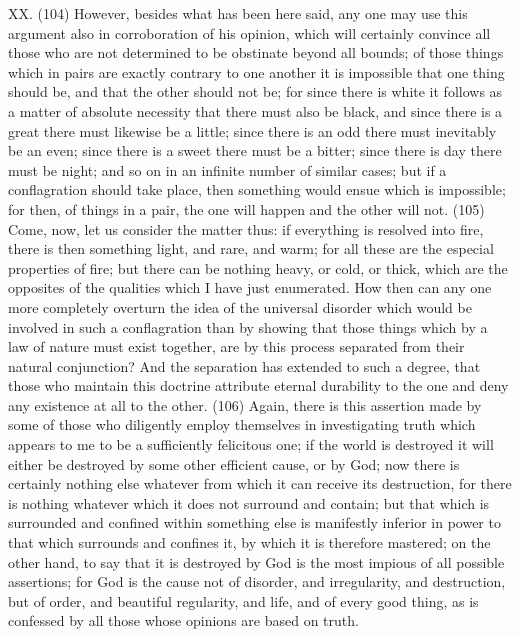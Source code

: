 XX. (104) However, besides what has been here said, any one may use this argument also in
corroboration of his opinion, which will certainly convince all those who are not determined to be
obstinate beyond all bounds; of those things which in pairs are exactly contrary to one another it is
impossible that one thing should be, and that the other should not be; for since there is white it
follows as a matter of absolute necessity that there must also be black, and since there is a great
there must likewise be a little; since there is an odd there must inevitably be an even; since there is
a sweet there must be a bitter; since there is day there must be night; and so on in an infinite
number of similar cases; but if a conflagration should take place, then something would ensue
which is impossible; for then, of things in a pair, the one will happen and the other will not. (105)
Come, now, let us consider the matter thus: if everything is resolved into fire, there is then
something light, and rare, and warm; for all these are the especial properties of fire; but there can
be nothing heavy, or cold, or thick, which are the opposites of the qualities which I have just
enumerated. How then can any one more completely overturn the idea of the universal disorder
which would be involved in such a conflagration than by showing that those things which by a law of
nature must exist together, are by this process separated from their natural conjunction? And the
separation has extended to such a degree, that those who maintain this doctrine attribute eternal
durability to the one and deny any existence at all to the other. (106) Again, there is this assertion
made by some of those who diligently employ themselves in investigating truth which appears to me
to be a sufficiently felicitous one; if the world is destroyed it will either be destroyed by some other
efficient cause, or by God; now there is certainly nothing else whatever from which it can receive
its destruction, for there is nothing whatever which it does not surround and contain; but that which
is surrounded and confined within something else is manifestly inferior in power to that which
surrounds and confines it, by which it is therefore mastered; on the other hand, to say that it is
destroyed by God is the most impious of all possible assertions; for God is the cause not of
disorder, and irregularity, and destruction, but of order, and beautiful regularity, and life, and of
every good thing, as is confessed by all those whose opinions are based on truth.

